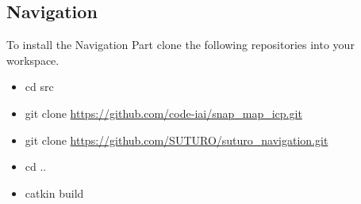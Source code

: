 \documentclass[main.tex]{subfiles}
\begin{document}
\subsection{Navigation}
To install the Navigation Part clone the following repositories into your workspace.	
\begin{itemize}
\item cd src
\item git clone \url{https://github.com/code-iai/snap_map_icp.git}
\item git clone \url{https://github.com/SUTURO/suturo_navigation.git}
\item cd ..
\item catkin build  
\end{itemize}
\end{document}
